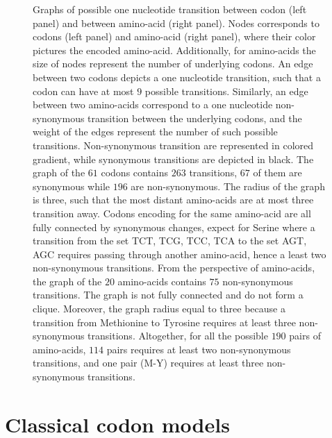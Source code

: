 \begin{figure}[htbp!]
    \caption[Graphs of {codon} and amino-acid transitions]{
    \label{fig:graph-codons-aa}
    Graphs of possible one nucleotide {transition} between \gls{codon} (left panel) and between amino-acid (right panel).
    Nodes corresponds to \glspl{codon} (left panel) and amino-acid (right panel), where their color pictures the encoded amino-acid.
    Additionally, for amino-acids the size of nodes represent the number of underlying \glspl{codon}.
    An edge between two \glspl{codon} depicts a one nucleotide {transition}, such that a \gls{codon} can have at most $9$ possible {transitions}.
    Similarly, an edge between two amino-acids correspond to a one nucleotide non-synonymous {transition} between the underlying \glspl{codon}, and the weight of the edges represent the number of such possible {transitions}.
    Non-synonymous {transition} are represented in colored gradient, while synonymous {transitions} are depicted in black.
    The graph of the $61$ \glspl{codon} contains $263$ {transitions}, $67$ of them are synonymous while $196$ are non-synonymous.
    The radius of the graph is three, such that the most distant amino-acids are at most three {transition} away.
    Codons encoding for the same amino-acid are all fully connected by synonymous changes, expect for Serine where a {transition} from the set {TCT, TCG, TCC, TCA} to the set {AGT, AGC} requires passing through another amino-acid, hence a least two non-synonymous {transitions}.
    From the perspective of amino-acids, the graph of the $20$ amino-acids contains $75$ non-synonymous {transitions}.
    The graph is not fully connected and do not form a clique. Moreover, the graph radius equal to three because a {transition} from Methionine to Tyrosine requires at least three non-synonymous {transitions}.
    Altogether, for all the possible $190$ pairs of amino-acids, $114$ pairs requires at least two non-synonymous {transitions}, and one pair (M-Y) requires at least three non-synonymous {transitions}.
    }
\end{figure}


\section{Classical codon models}
\label{sec:intro-classical-codon-models}

